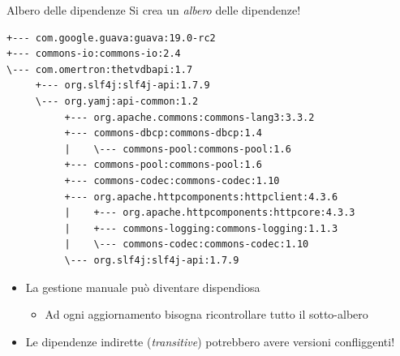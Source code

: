 \documentclass[presentation]{beamer}
\begin{document}
\begin{frame}[fragile]{Albero delle dipendenze}
    Si crea un \textit{albero} delle dipendenze!

    \begin{verbatim}
+--- com.google.guava:guava:19.0-rc2
+--- commons-io:commons-io:2.4
\--- com.omertron:thetvdbapi:1.7
     +--- org.slf4j:slf4j-api:1.7.9
     \--- org.yamj:api-common:1.2
          +--- org.apache.commons:commons-lang3:3.3.2
          +--- commons-dbcp:commons-dbcp:1.4
          |    \--- commons-pool:commons-pool:1.6
          +--- commons-pool:commons-pool:1.6
          +--- commons-codec:commons-codec:1.10
          +--- org.apache.httpcomponents:httpclient:4.3.6
          |    +--- org.apache.httpcomponents:httpcore:4.3.3
          |    +--- commons-logging:commons-logging:1.1.3
          |    \--- commons-codec:commons-codec:1.10
          \--- org.slf4j:slf4j-api:1.7.9
    \end{verbatim}
    \begin{itemize}
        \item La gestione manuale può diventare dispendiosa
        \begin{itemize}
            \item Ad ogni aggiornamento bisogna ricontrollare tutto il sotto-albero
        \end{itemize}
        \item Le dipendenze indirette (\textit{transitive}) potrebbero avere versioni confliggenti!
    \end{itemize}
\end{frame}
\end{document}

